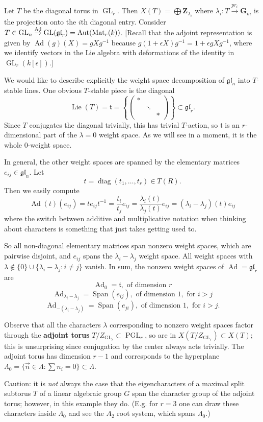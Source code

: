 \documentclass[10pt]{article}
\newcommand{\ZZ}{\mathbf{Z}}
\newcommand{\GL}{\operatorname{GL}}
\newcommand{\PGL}{\operatorname{PGL}}
\newcommand{\Lie}{\operatorname{Lie}}
\newcommand{\Span}{\operatorname{Span}}
\renewcommand{\(}{\left(}
\renewcommand{\)}{\right)}
\DeclareMathOperator{\Ad}{Ad}
\DeclareMathOperator{\Aut}{Aut}
\newcommand{\gl}{\mathfrak{gl}}
\newcommand{\diag}{\operatorname{diag}}
\numberwithin{thm}{subsection}
\begin{document}
\begin{ex}
Let $T$ be the diagonal torus in $\GL_r$.
Then $X(T)=\bigoplus \ZZ_{\lambda_i}$
where $\lambda_i:T\stackrel{pr_i}{\to}\mathbf{G}_m$ is the projection onto the $i$th diagonal entry.
Consider $T\in \GL_n\stackrel{\Ad}{\to}\GL(\gl_r)=\Aut({\rm{Mat}}_r(k))$.
[Recall that the adjoint representation
is given by $\Ad(g)(X)=gXg^{-1}$ because
$g(1+\epsilon X)g^{-1}=1+\epsilon gXg^{-1}$,
where we identify vectors in the Lie algebra
with deformations of the identity
in $\GL_r(k[\epsilon])$.]

We would like to describe explicitly the weight space decomposition
of $\gl_n$ into $T$-stable lines.
One obvious $T$-stable piece is the diagonal
\[\Lie(T)=\mathfrak t = \left\{\(\begin{smallmatrix}*&&\\ &\ddots&\\ &&*\end{smallmatrix}\)\right\}\subset \gl_r.\]
Since $T$ conjugates the diagonal trivially, this has trivial $T$-action,
so $\mathfrak t$ is an $r$-dimensional part of the $\lambda=0$
weight space. As we will see in a moment, it is the whole $0$-weight space.

In general, the other weight spaces are spanned by the elementary matrices $e_{ij}\in \mathfrak{gl}_n$.
Let $$t=\diag(t_1,\ldots, t_r)\in T(R).$$
Then we easily compute
\[\operatorname{Ad}(t)(e_{ij})=t e_{ij}t^{-1}=\frac{t_i}{t_j}e_{ij}=\frac{\lambda_i(t)}{\lambda_j(t)}e_{ij}
=(\lambda_i-\lambda_j)(t)e_{ij}\]
where the switch between additive and multiplicative notation
when thinking about characters is something that just takes getting used to.

So all non-diagonal elementary matrices
span nonzero weight spaces, which are pairwise disjoint, and $e_{ij}$
spans the $\lambda_i-\lambda_j$ weight space.
All weight spaces  with $\lambda\not\in\{0\}\cup\{\lambda_i-\lambda_j:i\neq j\}$ vanish.
In sum, the nonzero weight spaces of $\Ad = \gl_r$ are
\[\Ad_0 = \mathfrak t, \text{ of dimension }r\]
\[\Ad_{\lambda_i-\lambda_j}=\Span(e_{ij}),\text{ of dimension }1, \text{ for }i>j\]
\[\Ad_{-(\lambda_i-\lambda_j)}=\Span(e_{ji}),\text{ of dimension }1, \text{ for } i>j.\]

Observe that all the characters $\lambda$ corresponding to nonzero weight spaces
factor through the \textbf{adjoint torus} $T/Z_{\GL_r}\subset \PGL_r$,
so are in $X(T/Z_{\GL_r})\subset X(T)$; this is unsurprising
since conjugation by the center always acts trivially.
The adjoint torus has dimension $r-1$ and corresponds to the hyperplane
$\Lambda_0=\{\vec n\in \Lambda:\sum n_i=0\}\subset \Lambda$.

Caution: it is {\em not} always the case that the eigencharacters
of a maximal split subtorus $T$ of a linear algebraic group $G$
span the character group of the adjoint torus;
however, in this example they do. (E.g. for $r=3$ one can draw these
characters inside $\Lambda_0$ and see the $A_2$ root system, which spans
$\Lambda_0$.)
\end{ex}
\end{document}
